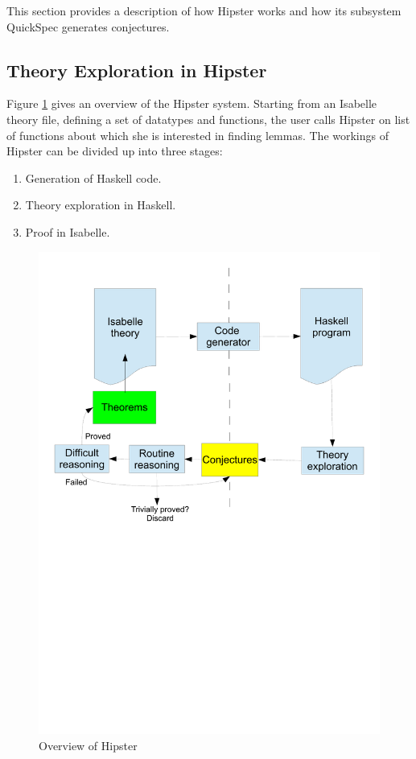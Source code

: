 \label{sec:background}
This section provides a description of how Hipster works and how its subsystem QuickSpec generates conjectures.

\subsection{Theory Exploration in Hipster}
Figure \ref{fig:hipster} gives an overview of the Hipster system. Starting from an Isabelle theory file, defining a set of datatypes and functions, the user calls Hipster on list of functions about which she is interested in finding lemmas. The workings of Hipster can be divided up into three stages:
\begin{enumerate}
\item Generation of Haskell code. 
\item Theory exploration in Haskell.
\item Proof in Isabelle.
\end{enumerate}
\begin{figure}[htbp]
\begin{center}
\includegraphics[scale=0.4]{hipster}
\caption{Overview of Hipster}
\label{fig:hipster}
\end{center}
\end{figure}
